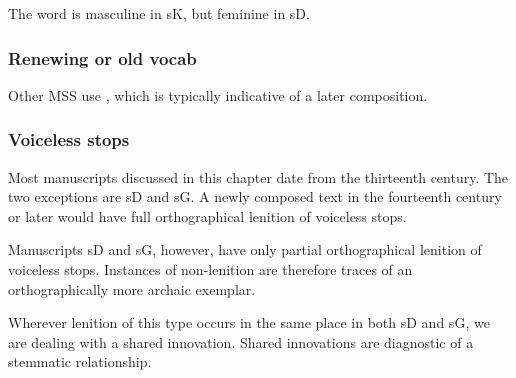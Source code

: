 The word  is masculine in \gls{sK}, but feminine in \gls{sD}.

\subsubsection{Renewing or old vocab}
\label{sec:renewing-or-old}


Other MSS use , which is typically indicative of a later composition.
\subsubsection{Voiceless stops}
\label{sec:voiceless-stops}

Most manuscripts discussed in this chapter date from the thirteenth century. The two exceptions are \gls{sD} and \gls{sG}. A newly composed text in the fourteenth century or later would  have full orthographical lenition of voiceless stops.

Manuscripts \gls{sD} and \gls{sG}, however, have only partial orthographical lenition of voiceless stops. Instances of non-lenition are therefore traces of an orthographically more archaic exemplar.

Wherever lenition of this type occurs in the same place in both \gls{sD} and \gls{sG}, we are dealing with a shared innovation. Shared innovations are diagnostic of a stemmatic relationship.


